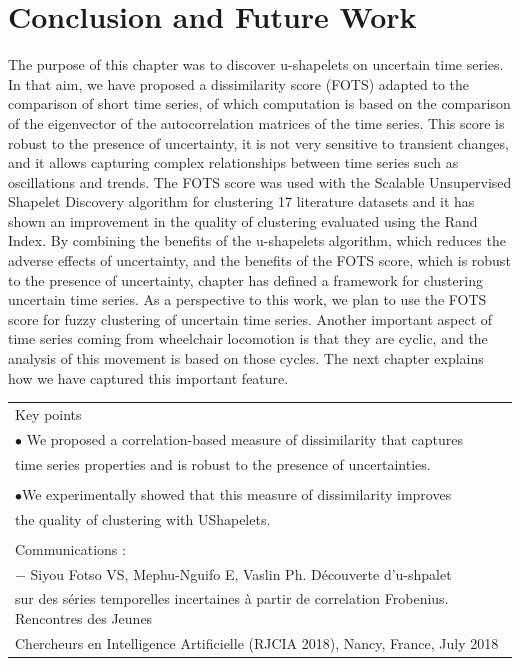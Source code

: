 \section[Conclusion]{Conclusion and Future Work}
The purpose of this chapter was to discover u-shapelets on uncertain time series. In that aim, we have proposed a dissimilarity score (FOTS) adapted to the comparison of short time series, of which computation is based on the comparison of the eigenvector of the autocorrelation matrices of the time series. This score is robust to the presence of uncertainty, it is not very sensitive to transient changes, and it allows capturing complex relationships between time series such as oscillations and trends. The FOTS score was used with the Scalable Unsupervised Shapelet Discovery algorithm for clustering 17 literature datasets and it has shown  an improvement in the quality of clustering evaluated using the Rand Index.  By combining the benefits of the u-shapelets algorithm, which reduces the adverse effects of uncertainty, and the benefits of the FOTS score, which is robust to the presence of uncertainty, chapter has defined a framework for clustering uncertain time series. As a perspective to this work, we plan to use the FOTS score for fuzzy clustering of uncertain time series. Another important aspect of time series coming from wheelchair locomotion is that they are cyclic, and the analysis of this movement is based on those cycles. The next chapter explains how we have captured this important feature.


\begin{table}[ht]
\centering
\begin{tabular}{|l|}

\hline
\rowcolor{LavenderBlush}
Key points\\
$\bullet$ We proposed a correlation-based measure of dissimilarity that captures\\ time series properties and is robust to the presence of uncertainties. \\
\\
$\bullet$We experimentally showed that this measure of dissimilarity improves \\the quality of clustering with UShapelets.\\ 
\\
Communications :\\
$-$ Siyou Fotso VS, Mephu-Nguifo E, Vaslin Ph. Découverte d'u-shpalet\\ sur des séries temporelles incertaines à partir de correlation Frobenius. Rencontres des Jeunes\\ Chercheurs en Intelligence Artificielle (RJCIA 2018), Nancy, France, July 2018\\
\hline
\end{tabular}
\end{table}